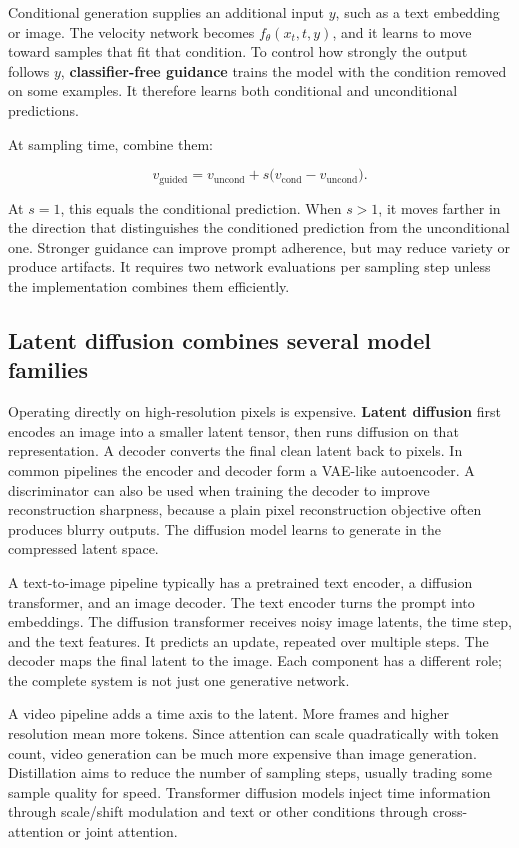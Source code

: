 Conditional generation supplies an additional input \(y\), such as a text embedding or image. The velocity network becomes \(f_\theta(x_t,t,y)\), and it learns to move toward samples that fit that condition. To control how strongly the output follows \(y\), \textbf{classifier-free guidance} trains the model with the condition removed on some examples. It therefore learns both conditional and unconditional predictions.

At sampling time, combine them:

\[
v_{\text{guided}}=v_{\text{uncond}}+s\big(v_{\text{cond}}-v_{\text{uncond}}\big).
\]

At \(s=1\), this equals the conditional prediction. When \(s>1\), it moves farther in the direction that distinguishes the conditioned prediction from the unconditional one. Stronger guidance can improve prompt adherence, but may reduce variety or produce artifacts. It requires two network evaluations per sampling step unless the implementation combines them efficiently.

\subsection{Latent diffusion combines several model families}\label{04-visual-computing-ii-ch031-latent-diffusion-combines-several-model-families}

Operating directly on high-resolution pixels is expensive. \textbf{Latent diffusion} first encodes an image into a smaller latent tensor, then runs diffusion on that representation. A decoder converts the final clean latent back to pixels. In common pipelines the encoder and decoder form a VAE-like autoencoder. A discriminator can also be used when training the decoder to improve reconstruction sharpness, because a plain pixel reconstruction objective often produces blurry outputs. The diffusion model learns to generate in the compressed latent space.

A text-to-image pipeline typically has a pretrained text encoder, a diffusion transformer, and an image decoder. The text encoder turns the prompt into embeddings. The diffusion transformer receives noisy image latents, the time step, and the text features. It predicts an update, repeated over multiple steps. The decoder maps the final latent to the image. Each component has a different role; the complete system is not just one generative network.

A video pipeline adds a time axis to the latent. More frames and higher resolution mean more tokens. Since attention can scale quadratically with token count, video generation can be much more expensive than image generation. Distillation aims to reduce the number of sampling steps, usually trading some sample quality for speed. Transformer diffusion models inject time information through scale/shift modulation and text or other conditions through cross-attention or joint attention.


